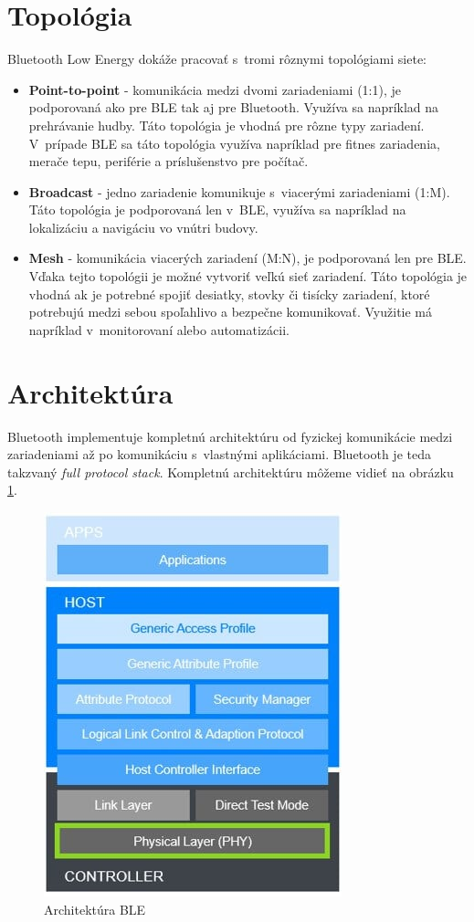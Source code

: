 \section{Topológia}
Bluetooth Low Energy dokáže pracovať s~tromi rôznymi topológiami siete:
\begin{itemize}
    \item \textbf{Point-to-point} - komunikácia medzi dvomi zariadeniami (1:1), je podporovaná ako pre BLE tak aj pre Bluetooth. Využíva sa napríklad na prehrávanie hudby. Táto topológia je vhodná pre rôzne typy zariadení. V~prípade BLE sa táto topológia využíva napríklad pre fitnes zariadenia, merače tepu, periférie a príslušenstvo pre počítač.
    \item \textbf{Broadcast} - jedno zariadenie komunikuje s~viacerými zariadeniami (1:M). Táto topológia je podporovaná len v~BLE, využíva sa napríklad na lokalizáciu a navigáciu vo vnútri budovy.  
    \item \textbf{Mesh} - komunikácia viacerých zariadení (M:N), je podporovaná len pre BLE. Vďaka tejto topológii je možné vytvoriť veľkú sieť zariadení. Táto topológia je vhodná ak je potrebné spojiť desiatky, stovky či tisícky zariadení, ktoré potrebujú medzi sebou spoľahlivo a bezpečne komunikovať. Využitie má napríklad v~monitorovaní alebo automatizácii.\cite{bluetooth}
\end{itemize}

\section{Architektúra} \label{sec:arch}
Bluetooth implementuje kompletnú architektúru od fyzickej komunikácie medzi zariadeniami až po komunikáciu s~vlastnými aplikáciami. Bluetooth je teda takzvaný \textit{full protocol stack}. Kompletnú architektúru môžeme vidieť na obrázku \ref{fig:ble_stack}.

\begin{figure}[ht]
    \centering
    \includegraphics[scale=0.6]{obrazky-figures/bluetooth_le_protocol_stack.jpg}
    \caption[Architektúra BLE]{Architektúra BLE\cite{bluetooth}}
    \label{fig:ble_stack}
\end{figure}

